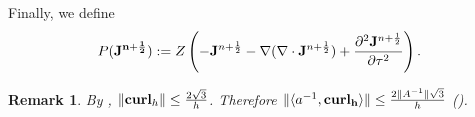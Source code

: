 \documentclass[12pt,reqno]{amsart}
\newcommand{\curl}{{\bf curl}}
\newcommand{\acurl}{\langle a^{-1},{\bf curl_h}\rangle}
\newtheorem{proposition}[theorem]{Proposition}
\newtheorem{remark}[theorem]{Remark}
\theoremstyle{definition}
\numberwithin{equation}{section}
\begin{document}


	
	Finally, we define 
	$$
	P({\bf J^{n+\frac{1}{2}}}):=Z\left ( -{\bf J}^{n+\frac{1}{2}}-\nabla (\nabla \cdot{\bf J}^{n+\frac{1}{2}})+\frac{\partial^2{\bf J}^{n+\frac{1}{2}}}{\partial \tau^2}\right ).
	$$
\begin{remark}\label{rem:curl estimates}
	By \cite[section 11]{GKO}, 
	$\|\curl_h\|\leq \frac{2\sqrt{3}}{h}$.
	Therefore $\|\acurl\|\leq \frac{2\|A^{-1}\|\sqrt{3}}{h}$ (\cite{yefet_turkel}).
\end{remark}

   
\end{document}
